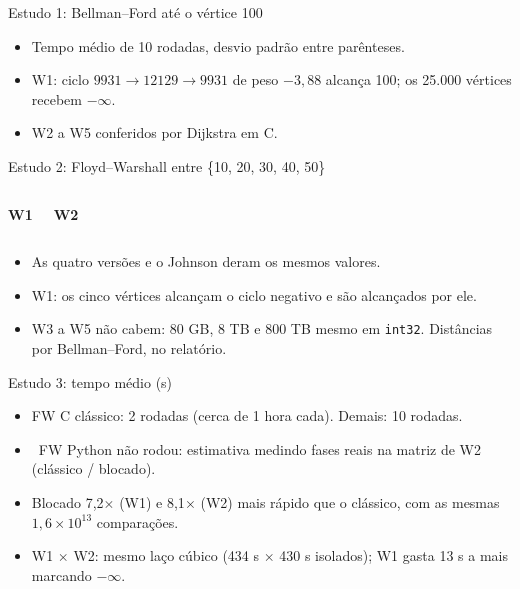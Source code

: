 \documentclass[10pt,aspectratio=169]{beamer}
\begin{document}
\begin{frame}{Estudo 1: Bellman--Ford até o vértice 100}
\centering{\TabelaDestino}
\par\medskip
\small
\begin{itemize}
\item Tempo médio de 10 rodadas, desvio padrão entre parênteses.
\item W1: ciclo \(9931\to12129\to9931\) de peso \(-3{,}88\) alcança 100; os 25.000 vértices recebem \(-\infty\).
\item W2 a W5 conferidos por Dijkstra em C.
\end{itemize}
\end{frame}

\begin{frame}{Estudo 2: Floyd--Warshall entre \{10, 20, 30, 40, 50\}}
\begin{columns}[T,onlytextwidth]
\centering \textbf{W1}\par\small\MatrizUm
{}\centering \textbf{W2}\par\small\MatrizDois
\end{columns}
\medskip
\small
\begin{itemize}
\item As quatro versões e o Johnson deram os mesmos valores.
\item W1: os cinco vértices alcançam o ciclo negativo e são alcançados por ele.
\item W3 a W5 não cabem: 80 GB, 8 TB e 800 TB mesmo em \texttt{int32}. Distâncias por Bellman--Ford, no relatório.
\end{itemize}
\end{frame}

\begin{frame}{Estudo 3: tempo médio (s)}
\centering{\TabelaTempos}
\par\medskip
\small
\begin{itemize}
\item FW C clássico: 2 rodadas (cerca de 1 hora cada). Demais: 10 rodadas.
\item \dag\ FW Python não rodou: estimativa medindo fases reais na matriz de W2 (clássico / blocado).
\item Blocado \alert{7,2\(\times\)} (W1) e \alert{8,1\(\times\)} (W2) mais rápido que o clássico, com as mesmas \(1{,}6\times10^{13}\) comparações.
\item W1 \(\times\) W2: mesmo laço cúbico (434 s \(\times\) 430 s isolados); W1 gasta 13 s a mais marcando \(-\infty\).
\end{itemize}
\end{frame}
\end{document}
